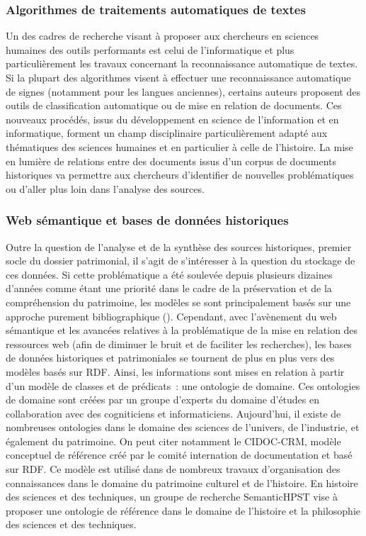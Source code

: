 \documentclass[a4paper,11pt,french]{article}
\begin{document}
\subsubsection{Algorithmes de traitements automatiques de textes}

Un des cadres de recherche visant à proposer aux chercheurs en sciences humaines des outils performants est celui de l'informatique et plus particulièrement les travaux concernant la reconnaissance automatique de textes.
Si la plupart des algorithmes visent à effectuer une reconnaissance automatique de signes (notamment pour les langues anciennes), certains auteurs proposent des outils de classification automatique ou de mise en relation de documents.
Ces nouveaux procédés, issus du développement en science de l'information et en informatique, forment un champ disciplinaire particulièrement adapté aux thématiques des sciences humaines et en particulier à celle de l'histoire. La mise en lumière de relations entre des documents issus d'un corpus de documents historiques va permettre aux chercheurs d'identifier de nouvelles problématiques ou d'aller plus loin dans l'analyse des sources.

\subsubsection{Web sémantique et bases de données historiques}

Outre la question de l'analyse et de la synthèse des sources historiques, premier socle du dossier patrimonial, il s'agit de s'intéresser à la question du stockage de ces données. Si cette problématique a été soulevée depuis plusieurs dizaines d'années comme étant une priorité dans le cadre de la préservation et de la compréhension du patrimoine, les modèles se sont principalement basés sur une approche purement bibliographique ().
Cependant, avec l'avènement du web sémantique et les avancées relatives à la problématique de la mise en relation des ressources web (afin de diminuer le bruit et de faciliter les recherches), les bases de données historiques et patrimoniales se tournent de plus en plus vers des modèles basés sur RDF.
Ainsi, les informations sont mises en relation à partir d'un modèle de classes et de prédicats~: une ontologie de domaine. Ces ontologies de domaine sont créées par un groupe d'experts du domaine d'études en collaboration avec des cogniticiens et informaticiens.
Aujourd'hui, il existe de nombreuses ontologies dans le domaine des sciences de l'univers, de l'industrie, et également du patrimoine. On peut citer notamment le CIDOC-CRM, modèle conceptuel de référence créé par le comité internation de documentation et basé sur RDF.
Ce modèle est utilisé dans de nombreux travaux d'organisation des connaissances dans le domaine du patrimoine culturel et de l'histoire. En histoire des sciences et des techniques, un groupe de recherche SemanticHPST vise à proposer une ontologie de référence dans le domaine de l'histoire et la philosophie des sciences et des techniques.
\end{document}

